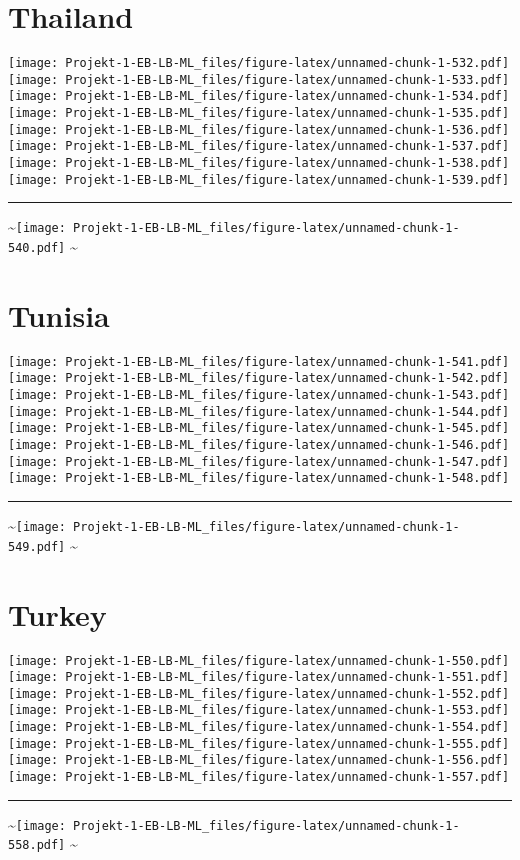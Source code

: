 \documentclass[]{article}
\begin{document}
\section{Thailand}\label{thailand}

\texttt{[image: Projekt-1-EB-LB-ML\_files/figure-latex/unnamed-chunk-1-532.pdf]}
\texttt{[image: Projekt-1-EB-LB-ML\_files/figure-latex/unnamed-chunk-1-533.pdf]}
\texttt{[image: Projekt-1-EB-LB-ML\_files/figure-latex/unnamed-chunk-1-534.pdf]}
\texttt{[image: Projekt-1-EB-LB-ML\_files/figure-latex/unnamed-chunk-1-535.pdf]}
\texttt{[image: Projekt-1-EB-LB-ML\_files/figure-latex/unnamed-chunk-1-536.pdf]}
\texttt{[image: Projekt-1-EB-LB-ML\_files/figure-latex/unnamed-chunk-1-537.pdf]}
\texttt{[image: Projekt-1-EB-LB-ML\_files/figure-latex/unnamed-chunk-1-538.pdf]}
\texttt{[image: Projekt-1-EB-LB-ML\_files/figure-latex/unnamed-chunk-1-539.pdf]}
\bigskip\hrule\bigskip
\textasciitilde{}\hfill\texttt{[image: Projekt-1-EB-LB-ML\_files/figure-latex/unnamed-chunk-1-540.pdf]}
\hfill \textasciitilde{} \vfill\eject

\section{Tunisia}\label{tunisia}

\texttt{[image: Projekt-1-EB-LB-ML\_files/figure-latex/unnamed-chunk-1-541.pdf]}
\texttt{[image: Projekt-1-EB-LB-ML\_files/figure-latex/unnamed-chunk-1-542.pdf]}
\texttt{[image: Projekt-1-EB-LB-ML\_files/figure-latex/unnamed-chunk-1-543.pdf]}
\texttt{[image: Projekt-1-EB-LB-ML\_files/figure-latex/unnamed-chunk-1-544.pdf]}
\texttt{[image: Projekt-1-EB-LB-ML\_files/figure-latex/unnamed-chunk-1-545.pdf]}
\texttt{[image: Projekt-1-EB-LB-ML\_files/figure-latex/unnamed-chunk-1-546.pdf]}
\texttt{[image: Projekt-1-EB-LB-ML\_files/figure-latex/unnamed-chunk-1-547.pdf]}
\texttt{[image: Projekt-1-EB-LB-ML\_files/figure-latex/unnamed-chunk-1-548.pdf]}
\bigskip\hrule\bigskip
\textasciitilde{}\hfill\texttt{[image: Projekt-1-EB-LB-ML\_files/figure-latex/unnamed-chunk-1-549.pdf]}
\hfill \textasciitilde{} \vfill\eject

\section{Turkey}\label{turkey}

\texttt{[image: Projekt-1-EB-LB-ML\_files/figure-latex/unnamed-chunk-1-550.pdf]}
\texttt{[image: Projekt-1-EB-LB-ML\_files/figure-latex/unnamed-chunk-1-551.pdf]}
\texttt{[image: Projekt-1-EB-LB-ML\_files/figure-latex/unnamed-chunk-1-552.pdf]}
\texttt{[image: Projekt-1-EB-LB-ML\_files/figure-latex/unnamed-chunk-1-553.pdf]}
\texttt{[image: Projekt-1-EB-LB-ML\_files/figure-latex/unnamed-chunk-1-554.pdf]}
\texttt{[image: Projekt-1-EB-LB-ML\_files/figure-latex/unnamed-chunk-1-555.pdf]}
\texttt{[image: Projekt-1-EB-LB-ML\_files/figure-latex/unnamed-chunk-1-556.pdf]}
\texttt{[image: Projekt-1-EB-LB-ML\_files/figure-latex/unnamed-chunk-1-557.pdf]}
\bigskip\hrule\bigskip
\textasciitilde{}\hfill\texttt{[image: Projekt-1-EB-LB-ML\_files/figure-latex/unnamed-chunk-1-558.pdf]}
\hfill \textasciitilde{} \vfill\eject
\end{document}
